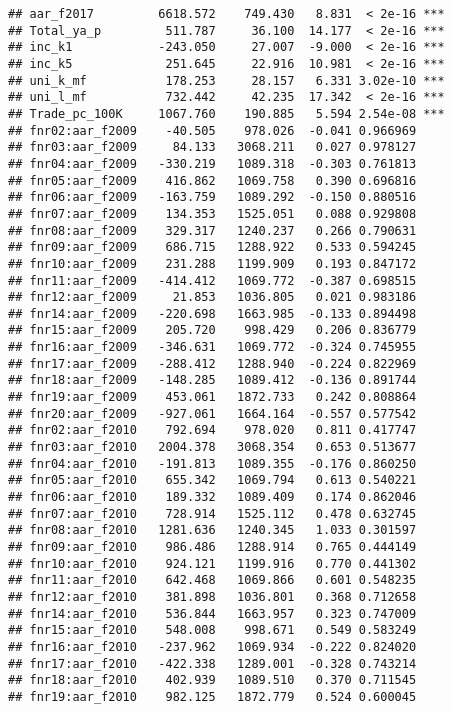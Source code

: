 \documentclass[
]{article}
\begin{document}
\begin{verbatim}
## aar_f2017         6618.572    749.430   8.831  < 2e-16 ***
## Total_ya_p         511.787     36.100  14.177  < 2e-16 ***
## inc_k1            -243.050     27.007  -9.000  < 2e-16 ***
## inc_k5             251.645     22.916  10.981  < 2e-16 ***
## uni_k_mf           178.253     28.157   6.331 3.02e-10 ***
## uni_l_mf           732.442     42.235  17.342  < 2e-16 ***
## Trade_pc_100K     1067.760    190.885   5.594 2.54e-08 ***
## fnr02:aar_f2009    -40.505    978.026  -0.041 0.966969    
## fnr03:aar_f2009     84.133   3068.211   0.027 0.978127    
## fnr04:aar_f2009   -330.219   1089.318  -0.303 0.761813    
## fnr05:aar_f2009    416.862   1069.758   0.390 0.696816    
## fnr06:aar_f2009   -163.759   1089.292  -0.150 0.880516    
## fnr07:aar_f2009    134.353   1525.051   0.088 0.929808    
## fnr08:aar_f2009    329.317   1240.237   0.266 0.790631    
## fnr09:aar_f2009    686.715   1288.922   0.533 0.594245    
## fnr10:aar_f2009    231.288   1199.909   0.193 0.847172    
## fnr11:aar_f2009   -414.412   1069.772  -0.387 0.698515    
## fnr12:aar_f2009     21.853   1036.805   0.021 0.983186    
## fnr14:aar_f2009   -220.698   1663.985  -0.133 0.894498    
## fnr15:aar_f2009    205.720    998.429   0.206 0.836779    
## fnr16:aar_f2009   -346.631   1069.772  -0.324 0.745955    
## fnr17:aar_f2009   -288.412   1288.940  -0.224 0.822969    
## fnr18:aar_f2009   -148.285   1089.412  -0.136 0.891744    
## fnr19:aar_f2009    453.061   1872.733   0.242 0.808864    
## fnr20:aar_f2009   -927.061   1664.164  -0.557 0.577542    
## fnr02:aar_f2010    792.694    978.020   0.811 0.417747    
## fnr03:aar_f2010   2004.378   3068.354   0.653 0.513677    
## fnr04:aar_f2010   -191.813   1089.355  -0.176 0.860250    
## fnr05:aar_f2010    655.342   1069.794   0.613 0.540221    
## fnr06:aar_f2010    189.332   1089.409   0.174 0.862046    
## fnr07:aar_f2010    728.914   1525.112   0.478 0.632745    
## fnr08:aar_f2010   1281.636   1240.345   1.033 0.301597    
## fnr09:aar_f2010    986.486   1288.914   0.765 0.444149    
## fnr10:aar_f2010    924.121   1199.916   0.770 0.441302    
## fnr11:aar_f2010    642.468   1069.866   0.601 0.548235    
## fnr12:aar_f2010    381.898   1036.801   0.368 0.712658    
## fnr14:aar_f2010    536.844   1663.957   0.323 0.747009    
## fnr15:aar_f2010    548.008    998.671   0.549 0.583249    
## fnr16:aar_f2010   -237.962   1069.934  -0.222 0.824020    
## fnr17:aar_f2010   -422.338   1289.001  -0.328 0.743214    
## fnr18:aar_f2010    402.939   1089.510   0.370 0.711545    
## fnr19:aar_f2010    982.125   1872.779   0.524 0.600045    

\end{verbatim}
\end{document}
